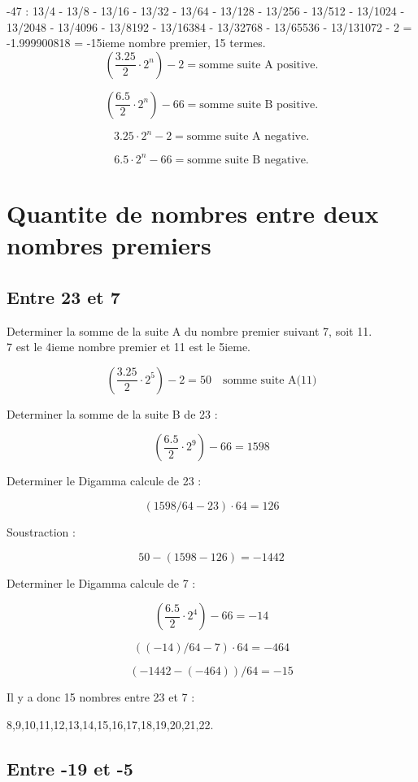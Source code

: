 \documentclass[a4paper,11pt]{article}
\begin{document}
-47 : 13/4 - 13/8 - 13/16 - 13/32 - 13/64 - 13/128 - 13/256 - 13/512 - 13/1024 - 13/2048 - 13/4096 - 13/8192 - 13/16384 - 13/32768 - 13/65536 - 13/131072 - 2 = -1.999900818 = -15ieme nombre premier, 15 termes.\\

\[
\left(\frac{3.25}{2} \cdot 2^{n}\right) - 2 = \text{somme suite A positive.}
\]

\[
\left(\frac{6.5}{2} \cdot 2^{n}\right) - 66 = \text{somme suite B positive.}
\]

\[
3.25 \cdot 2^{n} - 2 = \text{somme suite A negative.}
\]

\[
6.5 \cdot 2^{n} - 66 = \text{somme suite B negative.}
\]

\section*{Quantite de nombres entre deux nombres premiers}

\subsection*{Entre 23 et 7}

Determiner la somme de la suite A du nombre premier suivant 7, soit 11.\\
7 est le 4ieme nombre premier et 11 est le 5ieme.

\[
\left(\frac{3.25}{2} \cdot 2^{5}\right) - 2 = 50 \quad \text{somme suite A(11)}
\]

Determiner la somme de la suite B de 23 :

\[
\left(\frac{6.5}{2} \cdot 2^{9}\right) - 66 = 1598
\]

Determiner le Digamma calcule de 23 :

\[
(1598/64 - 23) \cdot 64 = 126
\]

Soustraction :

\[
50 - (1598 - 126) = -1442
\]

Determiner le Digamma calcule de 7 :

\[
\left(\frac{6.5}{2} \cdot 2^{4}\right) - 66 = -14
\]

\[
((-14)/64 - 7) \cdot 64 = -464
\]

\[
(-1442 - (-464))/64 = -15
\]

Il y a donc 15 nombres entre 23 et 7 :

8,9,10,11,12,13,14,15,16,17,18,19,20,21,22.

\subsection*{Entre -19 et -5}
\end{document}

